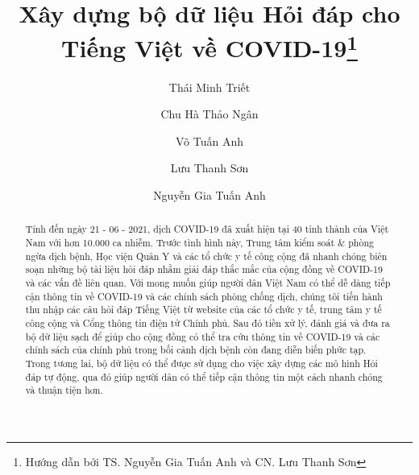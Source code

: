 \documentclass[runningheads]{llncs}
\begin{document}
%
\title{Xây dựng bộ dữ liệu Hỏi đáp cho Tiếng Việt về COVID-19\thanks{Hướng dẫn bởi TS. Nguyễn Gia Tuấn Anh và CN. Lưu Thanh Sơn}}
%
%
\author{Thái Minh Triết \and
Chu Hà Thảo Ngân \and
Võ Tuấn Anh \and
Lưu Thanh Sơn \and
Nguyễn Gia Tuấn Anh 
}
%
%

%
\maketitle              %
%
\begin{abstract}
Tính đến ngày 21 - 06 - 2021, dịch COVID-19 đã xuất hiện tại 40 tỉnh thành của Việt Nam với hơn 10.000 ca nhiễm. Trước tình hình này, Trung tâm kiểm soát \& phòng ngừa dịch bệnh, Học viện Quân Y và các tổ chức y tế công cộng đã nhanh chóng biên soạn những bộ tài liệu hỏi đáp nhằm giải đáp thắc mắc của cộng đồng về COVID-19 và các vấn đề liên quan.
Với mong muốn giúp người dân Việt Nam có thể dễ dàng tiếp cận thông tin về COVID-19 và các chính sách phòng chống dịch, chúng tôi tiến hành thu nhập các câu hỏi đáp Tiếng Việt từ website của các tổ chức y tế, trung tâm y tế công cộng và Cổng thông tin điện tử Chính phủ. Sau đó tiền xử lý, đánh giá và đưa ra bộ dữ liệu sạch để giúp cho cộng đồng có thể tra cứu thông tin về COVID-19 và các chính sách của chính phủ trong bối cảnh dịch bệnh còn đang diễn biến phức tạp. Trong tương lai, bộ dữ liệu có thể được sử dụng cho việc xây dựng các mô hình Hỏi đáp tự động, qua đó giúp người dân có thể tiếp cận thông tin một cách nhanh chóng và thuận tiện hơn.


\end{abstract}
%
%
%
\end{document}
